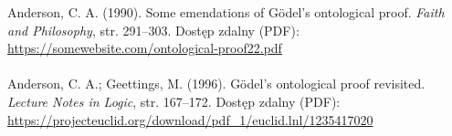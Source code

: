 \documentclass{eiti-raport}
\begin{document}
\begin{multicols}{2}
\noindent [Anderson, 1990] Anderson, C. A. (1990). Some emendations of G\"odel’s ontological proof. \textit{Faith and Philosophy}, str. 291–303. Dostęp zdalny (PDF): \url{https://somewebsite.com/ontological-proof22.pdf}  
\\ \\
\noindent [Anderson, 1996] Anderson, C. A.; Geettings, M. (1996). G\"odel’s ontological proof revisited. \textit{Lecture Notes in Logic}, str. 167–172. Dostęp zdalny (PDF): \url{https://projecteuclid.org/download/pdf_1/euclid.lnl/1235417020}


\end{multicols}
\end{document}
